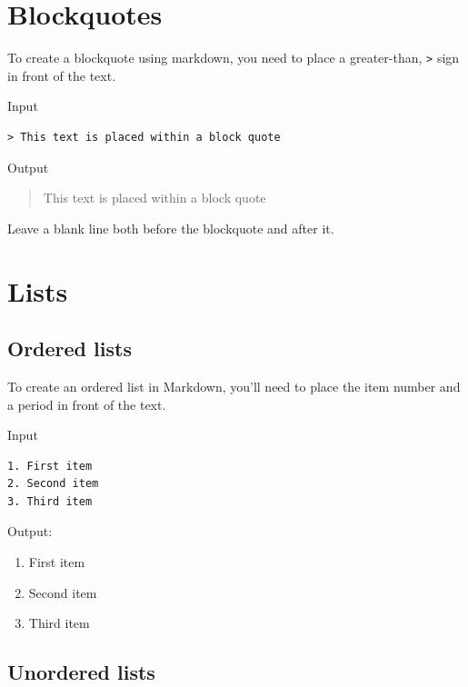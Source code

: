 \documentclass[
]{book}
\providecommand{\tightlist}{%
  \setlength{\itemsep}{0pt}\setlength{\parskip}{0pt}}
\begin{document}
\section{Blockquotes}\label{blockquotes}

To create a blockquote using markdown, you need to place a greater-than, \texttt{\textgreater{}} sign in front of the text.

Input

\begin{verbatim}
> This text is placed within a block quote
\end{verbatim}

Output

\begin{quote}
This text is placed within a block quote
\end{quote}

Leave a blank line both before the blockquote and after it.

\section{Lists}\label{lists}

\subsection*{Ordered lists}\label{ordered-lists}

To create an ordered list in Markdown, you'll need to place the item number and a period in front of the text.

Input

\begin{verbatim}
1. First item
2. Second item
3. Third item 
\end{verbatim}

Output:

\begin{enumerate}
\def\labelenumi{\arabic{enumi}.}
\tightlist
\item
  First item
\item
  Second item
\item
  Third item
\end{enumerate}

\subsection*{Unordered lists}\label{unordered-lists}
\end{document}
